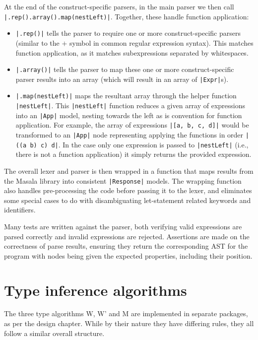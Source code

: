 \documentclass[a4paper,fleqn,oneside,12pt]{report}
\begin{document}
At the end of the construct-specific parsers, in the main parser we then call \texttt{|.rep().array().map(nestLeft)|}. Together, these handle function application:
\begin{itemize}
  \item \texttt{|.rep()|} tells the parser to require one or more construct-specific parsers (similar to the $+$ symbol in common regular expression syntax). This matches function application, as it matches subexpressions separated by whitespaces.
  \item \texttt{|.array()|} tells the parser to map these one or more construct-specific parser results into an array (which will result in an array of \texttt{|Expr|}s).
  \item \texttt{|.map(nestLeft)|} maps the resultant array through the helper function \texttt{|nestLeft|}. This \texttt{|nestLeft|} function reduces a given array of expressions into an \texttt{|App|} model, nesting towards the left as is convention for function application. For example, the array of expressions \texttt{|[a, b, c, d]|} would be transformed to an \texttt{|App|} node representing applying the functions in order \texttt{|((a b) c) d|}. In the case only one expression is passed to \texttt{|nestLeft|} (i.e., there is not a function application) it simply returns the provided expression.
\end{itemize}

The overall lexer and parser is then wrapped in a function that maps results from the Masala library into consistent \texttt{|Response|} models. The wrapping function also handles pre-processing the code before passing it to the lexer, and eliminates some special cases to do with disambiguating let-statement related keywords and identifiers.

Many tests are written against the parser, both verifying valid expressions are parsed correctly and invalid expressions are rejected. Assertions are made on the correctness of parse results, ensuring they return the corresponding AST for the program with nodes being given the expected properties, including their position.
\section{Type inference algorithms}\label{id:h.flyu66glh76t}
The three type algorithms W, W’ and M are implemented in separate packages, as per the design chapter. While by their nature they have differing rules, they all follow a similar overall structure.
\end{document}

